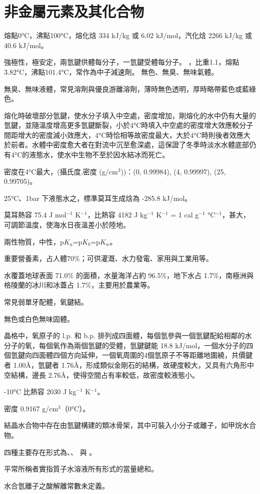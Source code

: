 \documentclass[a4paper,12pt]{report}
\begin{document}
\section{非金屬元素及其化合物}
\bit
\item 熔點0°C，沸點100°C，熔化焓 334 kJ/kg 或 6.02 kJ/mol，汽化焓 2266 kJ/kg 或 40.6 kJ/mol。
\item 強極性，極安定，兩氫鍵供體每分子，一氫鍵受體每分子。
\eit
{}
，比重1.1，熔點3.82°C，沸點101.4°C，常作為中子減速劑。
無色、無臭、無味氣體。
\bit
\item 無臭、無味液體，常見溶劑與優良游離溶劑，薄時無色透明，厚時略帶藍色或藍綠色。
\item 熔化時破壞部分氫鍵，使水分子填入中空處，密度增加，剛熔化的水中仍有大量的氫鍵，並隨溫度增高更多氫鍵斷裂，小於4°C時填入中空處的密度增大效應較分子間距增大的密度減小效應大，4°C時恰相等故密度最大，大於4°C時則後者效應大於前者。水體中密度愈大者在對流中沉至愈深處，這保證了冬季時淡水水體底部仍有4°C的液態水，使水中生物不至於因水結冰而死亡。
\item 密度在4°C最大，(攝氏度,密度 (g/cm$^3$))：(0, 0.99984), (4, 0.99997), (25, 0.99705)。
\item 25°C、1bar 下液態水之，標準莫耳生成焓為 -285.8 kJ/mol。
\item 莫耳熱容 75.4 J mol$^{-1}$ K$^{-1}$，比熱容 4182 J kg$^{-1}$ K$^{-1}$ = 1 cal g$^{-1}$ °C$^{-1}$，甚大，可調節溫度，使海水日夜溫差小於陸地。
\item 兩性物質，中性，p$K_a$=p$K_b$=p$K_w$。
\item 重要營養素，占人體70\%；可供灌溉、水力發電、家用與工業用等。
\item 水覆蓋地球表面 71.0\% 的面積，水量海洋占約 96.5\%，地下水占 1.7\%，南極洲與格陵蘭的冰川和冰蓋占 1.7\%，主要用於農業等。
\item 常見弱單牙配體，氧鍵結。
\eit
{}
\bit
\item 無色或白色無味固體。
\item 晶格中，氧原子的 l.p. 和 b.p. 排列成四面體，每個氫參與一個氫鍵配給相鄰的水分子的氧，每個氧作為兩個氫鍵的受體，氫鍵鍵能 18.8 kJ/mol，一個水分子的四個氫鍵向四面體四個方向延伸，一個氧周圍的4個氫原子不等距離地圍繞，共價鍵者 1.00\AA，氫鍵者 1.76\AA，形成類似金剛石的結構，故硬度較大，又具有六角形中空結構，邊長  2.76\AA，使得空間占有率較低，故密度較液態小。
\item -10°C 比熱容 2030 J kg$^{-1}$ K$^{-1}$。
\item 密度 0.9167 g/cm$^3$（0°C）。
\item 結晶水合物中存在由氫鍵構建的類冰骨架，其中可裝入小分子或離子，如甲烷水合物。
\eit
{}
\bit
\item 四種主要存在形式為、、 與 。
\item 平常所稱者實指質子水溶液所有形式的當量總和。
\item 水合氫離子之酸解離常數未定義。
\eit
{}
\end{document}
